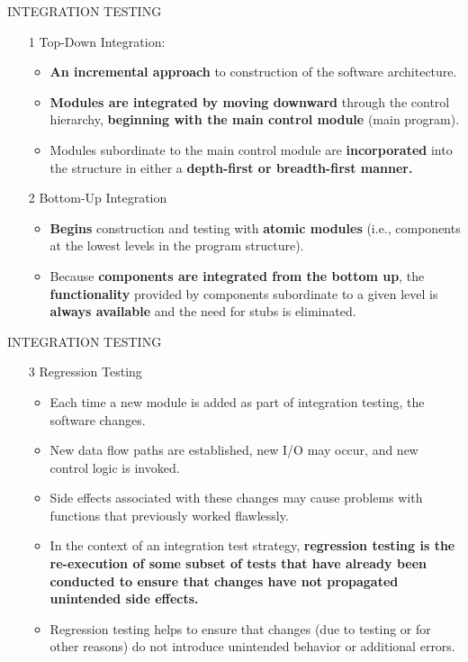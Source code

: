 \documentclass{beamer}
\begin{document}
\begin{frame}{INTEGRATION TESTING}
\begin{itemize}
	\item[1] Top-Down Integration: 
	\begin{itemize}
		\item \textbf{An incremental approach} to construction of the software architecture. 
		\item \textbf{Modules are integrated by moving downward} through the control hierarchy, \textbf{beginning with the main control module} (main program). 
		\item Modules subordinate to the main control module are \textbf{incorporated }into the structure in either a \textbf{depth-first or breadth-first manner.}
		
	\end{itemize}
\item[2] Bottom-Up Integration
\begin{itemize}
	\item \textbf{Begins} construction and testing with \textbf{atomic modules} (i.e., components at the lowest levels in the program structure). 
	\item Because \textbf{components are integrated from the bottom up}, the \textbf{functionality} provided by components subordinate to a given level is\textbf{ always available} and the need for stubs is eliminated.
	
\end{itemize}
\end{itemize}
\end{frame}
\begin{frame}{INTEGRATION TESTING}
	\begin{itemize}
		\item[3] Regression Testing
		\begin{itemize}
			\item Each time a new module is added as part of integration testing, the software changes. 
			\item New data flow paths are established, new I/O may occur, and new control logic is invoked. 
			\item Side effects associated with these changes may cause problems with functions that previously worked flawlessly. 
			\item In the context of an integration test strategy,\textbf{ regression testing is the re-execution of some subset of tests that have already been conducted to ensure that changes have not propagated unintended side effects. }
			\item Regression testing helps to ensure that changes (due to testing or for other reasons) do not introduce unintended behavior or additional errors.
		\end{itemize}
	\end{itemize}
\end{frame}
\end{document}
